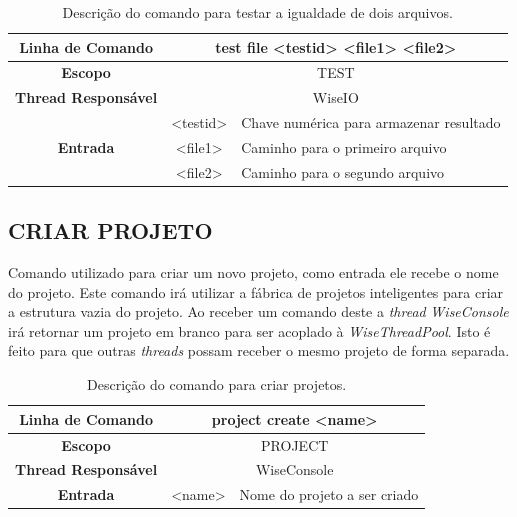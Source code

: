 \begin{center}
	\begin{table}[!htbp]
		\begin{tabularx}{\textwidth}{c|c|X}
			\toprule
			\textbf{Linha de Comando} & \multicolumn{2}{c}{test file <test\underline{\space\space}id> <file1> <file2>} \\
			\midrule
			\textbf{Escopo} & \multicolumn{2}{c}{TEST} \\
			\hline
			\textbf{Thread Responsável} & \multicolumn{2}{c}{WiseIO} \\
			\hline
			\multirow{3}{*}{\textbf{Entrada}} & <test\underline{\space\space}id> & Chave numérica para armazenar resultado \\
			& <file1> & Caminho para o primeiro arquivo \\
			& <file2> & Caminho para o segundo arquivo \\
			\bottomrule
		\end{tabularx}
		\caption{Descrição do comando para testar a igualdade de dois arquivos.}
		\label{tab:file_test}
	\end{table}
\end{center}

\subsection{CRIAR PROJETO}\label{sec:create_projects}

Comando utilizado para criar um novo projeto, como entrada ele recebe o nome do projeto. Este comando irá utilizar a fábrica de projetos inteligentes para criar a estrutura vazia do projeto. Ao receber um comando deste a \textit{thread} \textit{WiseConsole} irá retornar um projeto em branco para ser acoplado à \textit{WiseThreadPool}. Isto é feito para que outras \textit{threads} possam receber o mesmo projeto de forma separada.

\begin{center}
	\begin{table}[!htbp]
		\begin{tabularx}{\textwidth}{c|c|X}
			\toprule
			\textbf{Linha de Comando} & \multicolumn{2}{c}{project create <name>} \\
			\midrule
			\textbf{Escopo} & \multicolumn{2}{c}{PROJECT} \\
			\hline
			\textbf{Thread Responsável} & \multicolumn{2}{c}{WiseConsole} \\
			\hline
			\textbf{Entrada} & <name> & Nome do projeto a ser criado \\
			\bottomrule
		\end{tabularx}
		\caption{Descrição do comando para criar projetos.}
		\label{tab:create_project}
	\end{table}
\end{center}

